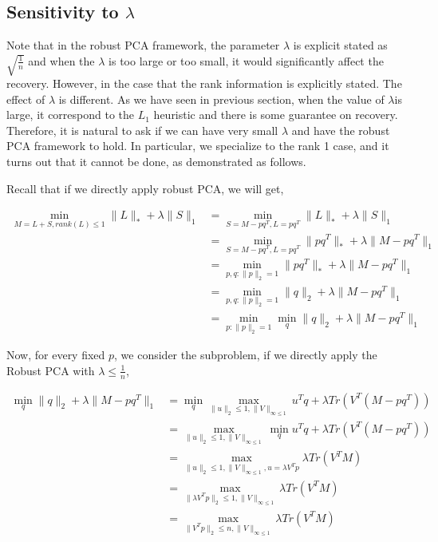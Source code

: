 \subsection{Sensitivity to $\lambda$}

Note that in the robust PCA framework, the parameter $\lambda$ is
explicit stated as $\sqrt{\frac{1}{n}}$ and when the $\lambda$ is
too large or too small, it would significantly affect the recovery.
However, in the case that the rank information is explicitly stated.
The effect of $\lambda$ is different. As we have seen in previous
section, when the value of $\lambda$is large, it correspond to the
$L_{1}$ heuristic and there is some guarantee on recovery. Therefore,
it is natural to ask if we can have very small $\lambda$ and have
the robust PCA framework to hold. In particular, we specialize to
the rank 1 case, and it turns out that it cannot be done, as demonstrated
as follows.

Recall that if we directly apply robust PCA, we will get,

\begin{align*}
 \min_{M=L+S,rank(L)\le1}\|L\|_{*}+\lambda\|S\|_{1}
 & = \min_{S=M-pq^{T},L=pq^{T}}\|L\|_{*}+\lambda\|S\|_{1} \\
 & = \min_{S=M-pq^{T},L=pq^{T}}\|pq^{T}\|_{*}+\lambda\|M-pq^{T}\|_{1} \\
 & = \min_{p,q:\|p\|_{2}=1}\|pq^{T}\|_{*}+\lambda\|M-pq^{T}\|_{1} \\
 & = \min_{p,q:\|p\|_{2}=1}\|q\|_{2}+\lambda\|M-pq^{T}\|_{1} \\
 & = \min_{p:\|p\|_{2}=1}\min_{q}\|q\|_{2}+\lambda\|M-pq^{T}\|_{1}
\end{align*}


Now, for every fixed $p$, we consider the subproblem, if we directly
apply the Robust PCA with $\lambda\le\frac{1}{n}$,

\begin{align*}
\min_{q}\|q\|_{2}+\lambda\|M-pq^{T}\|_{1}
& = \min_{q}\max_{\|u\|_{2}\le1,\|V\|_{\infty\le1}}u^{T}q+\lambda Tr(V^{T}(M-pq^{T})) \\
& = \max_{\|u\|_{2}\le1,\|V\|_{\infty\le1}}\min_{q}u^{T}q+\lambda Tr(V^{T}(M-pq^{T})) \\
& = \max_{\|u\|_{2}\le1,\|V\|_{\infty\le1},u=\lambda V^{T}p} \lambda Tr(V^{T}M) \\
& = \max_{\|\lambda V^{T}p\|_{2}\le1,\|V\|_{\infty\le1}} \lambda Tr(V^{T}M) \\
& = \max_{\|V^{T}p\|_{2}\le n,\|V\|_{\infty\le1}} \lambda Tr(V^{T}M)
\end{align*}



